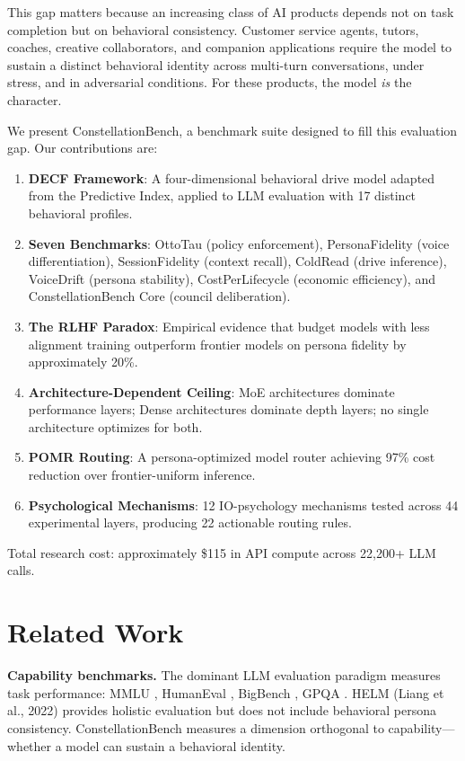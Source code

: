 \documentclass[conference]{IEEEtran}
\begin{document}
This gap matters because an increasing class of AI products depends not on task completion but on behavioral consistency. Customer service agents, tutors, coaches, creative collaborators, and companion applications require the model to sustain a distinct behavioral identity across multi-turn conversations, under stress, and in adversarial conditions. For these products, the model \textit{is} the character.

We present ConstellationBench, a benchmark suite designed to fill this evaluation gap. Our contributions are:

\begin{enumerate}
\item \textbf{DECF Framework}: A four-dimensional behavioral drive model adapted from the Predictive Index, applied to LLM evaluation with 17 distinct behavioral profiles.
\item \textbf{Seven Benchmarks}: OttoTau (policy enforcement), PersonaFidelity (voice differentiation), SessionFidelity (context recall), ColdRead (drive inference), VoiceDrift (persona stability), CostPerLifecycle (economic efficiency), and ConstellationBench Core (council deliberation).
\item \textbf{The RLHF Paradox}: Empirical evidence that budget models with less alignment training outperform frontier models on persona fidelity by approximately 20\%.
\item \textbf{Architecture-Dependent Ceiling}: MoE architectures dominate performance layers; Dense architectures dominate depth layers; no single architecture optimizes for both.
\item \textbf{POMR Routing}: A persona-optimized model router achieving 97\% cost reduction over frontier-uniform inference.
\item \textbf{Psychological Mechanisms}: 12 IO-psychology mechanisms tested across 44 experimental layers, producing 22 actionable routing rules.
\end{enumerate}

Total research cost: approximately \$115 in API compute across 22,200+ LLM calls.

\section{Related Work}

\textbf{Capability benchmarks.} The dominant LLM evaluation paradigm measures task performance: MMLU \cite{hendrycks2021}, HumanEval \cite{chen2021}, BigBench \cite{srivastava2022}, GPQA \cite{rein2023}. HELM (Liang et al., 2022) provides holistic evaluation but does not include behavioral persona consistency. ConstellationBench measures a dimension orthogonal to capability---whether a model can sustain a behavioral identity.
\end{document}

